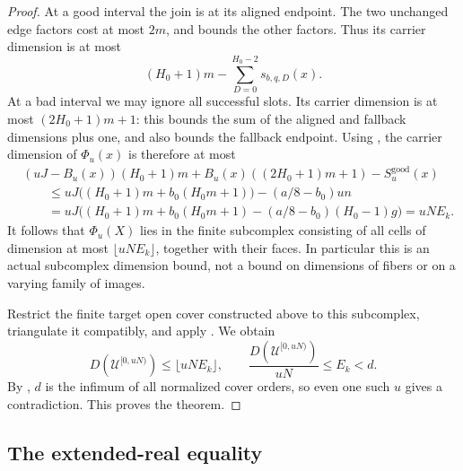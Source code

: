 \begin{proof}
At a good interval the join is at its aligned endpoint.
The two unchanged edge factors cost at most $2m$, and
 bounds the other factors.
Thus its carrier dimension is at most
\[
 (H_0+1)m-\sum_{D=0}^{H_0-2}s_{b,q,D}(x).
\]
At a bad interval we may ignore all successful slots.  Its
carrier dimension is at most $(2H_0+1)m+1$: this bounds
the sum of the aligned and fallback dimensions plus one,
and also bounds the fallback endpoint.  Using
,
the carrier dimension of $\Phi_u(x)$ is therefore at most
\begin{align*}
 &(uJ-B_u(x))(H_0+1)m
   +B_u(x)((2H_0+1)m+1)-S_u^{\mathrm{good}}(x)\\
 &\qquad\le uJ\bigl((H_0+1)m+b_0(H_0m+1)\bigr)
                 -(a/8-b_0)un\\
 &\qquad= uJ\bigl((H_0+1)m+b_0(H_0m+1)
                   -(a/8-b_0)(H_0-1)g\bigr)
   =uNE_k.
\end{align*}
It follows that $\Phi_u(X)$ lies in the finite subcomplex
consisting of all cells of dimension at most
$\lfloor uNE_k\rfloor$, together with their faces.  In
particular this is an actual subcomplex dimension bound,
not a bound on dimensions of fibers or on a varying family
of images.

Restrict the finite target open cover constructed above
to this subcomplex, triangulate it compatibly, and apply
.  We obtain
\[
 D(\mathcal U^{[0,uN)})\le\lfloor uNE_k\rfloor,
 \qquad
 \frac{D(\mathcal U^{[0,uN)})}{uN}\le E_k<d.
\]
By , $d$ is the infimum of all normalized
cover orders, so even one such $u$ gives a contradiction.  This proves
the theorem.
\end{proof}

\subsection{The extended-real equality}


